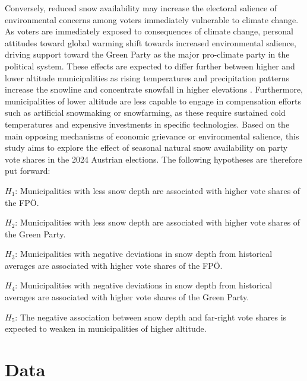 \documentclass{article}
\begin{document}
Conversely, reduced snow availability may increase the electoral salience of environmental concerns among voters immediately vulnerable to climate change. As voters are immediately exposed to consequences of climate change, personal attitudes toward global warming shift towards increased environmental salience, driving support toward the Green Party as the major pro-climate party in the political system. 
These effects are expected to differ further between higher and lower altitude municipalities as rising temperatures and precipitation patterns increase the snowline and concentrate snowfall in higher elevations \parencite{li2025}. Furthermore, municipalities of lower altitude are less capable to engage in compensation efforts such as artificial snowmaking or snowfarming, as these require sustained cold temperatures and expensive investments in specific technologies. 
Based on the main opposing mechanisms of economic grievance or environmental salience, this study aims to explore the effect of seasonal natural snow availability on party vote shares in the 2024 Austrian elections. The following hypotheses are therefore put forward: 
\vspace{1em}

\noindent $H_1$: Municipalities with less snow depth are associated with higher vote shares of the FPÖ.

\vspace{0.5em}
\noindent $H_2$: Municipalities with less snow depth are associated with higher vote shares of the Green Party.

\vspace{0.5em}
\noindent $H_3$: Municipalities with negative deviations in snow depth from historical averages are associated with higher vote shares of the FPÖ.

\vspace{0.5em}
\noindent $H_4$: Municipalities with negative deviations in snow depth from historical averages are associated with higher vote shares of the Green Party.

\vspace{0.5em}
\noindent $H_5$: The negative association between snow depth and far-right vote shares is expected to weaken in municipalities of higher altitude.



\vspace{2em}




\section{Data}
\end{document}
